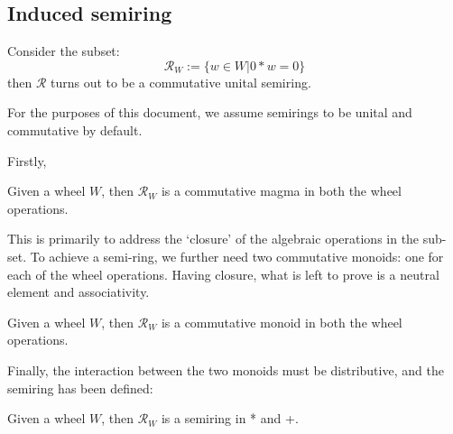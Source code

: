\subsection{Induced semiring}
Consider the subset:
\[
\mathcal{R}_{W} := \{ w \in W | 0*w = 0 \}
\]
then $\mathcal{R}$ turns out to be a commutative unital semiring.
\begin{remark}
 For the purposes of this document, we assume semirings to be unital and commutative by default.
\end{remark}
Firstly,
\begin{definition}
  \leanok
  Given a wheel $W$, then $\mathcal{R}_{W}$ is a commutative magma in both the wheel operations.
\end{definition}
This is primarily to address the `closure' of the algebraic operations in the sub-set. To achieve a semi-ring,
we further need two commutative monoids: one for each of the wheel operations. Having closure, what is left to prove is
a neutral element and associativity.
\begin{definition}
  \leanok
  Given a wheel $W$, then $\mathcal{R}_{W}$ is a commutative monoid in both the wheel operations.
\end{definition}
Finally, the interaction between the two monoids must be distributive, and the semiring has been defined:
\begin{definition}
  Given a wheel $W$, then $\mathcal{R}_{W}$ is a semiring in * and +.
\end{definition}
